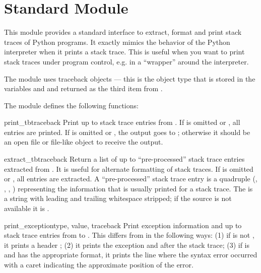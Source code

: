 \section{Standard Module }




This module provides a standard interface to extract, format and print
stack traces of Python programs.  It exactly mimics the behavior of
the Python interpreter when it prints a stack trace.  This is useful
when you want to print stack traces under program control, e.g. in a
``wrapper'' around the interpreter.

The module uses traceback objects --- this is the object type
that is stored in the variables  and
 and returned as the third item from
.

The module defines the following functions:

\begin{funcdesc}{print_tb}{traceback}
Print up to  stack trace entries from .  If
 is omitted or , all entries are printed.
If  is omitted or , the output goes to
; otherwise it should be an open file or file-like
object to receive the output.
\end{funcdesc}

\begin{funcdesc}{extract_tb}{traceback}
Return a list of up to  ``pre-processed'' stack trace
entries extracted from .  It is useful for alternate
formatting of stack traces.  If  is omitted or ,
all entries are extracted.  A ``pre-processed'' stack trace entry is a
quadruple (, , ,
) representing the information that is usually printed
for a stack trace.  The  is a string with leading and
trailing whitespace stripped; if the source is not available it is
.
\end{funcdesc}

\begin{funcdesc}{print_exception}{type, value,
traceback}
Print exception information and up to  stack trace entries
from  to .
This differs from  in the
following ways: (1) if  is not , it prints a
header ; (2) it prints the
exception  and  after the stack trace; (3) if
 is  and  has the appropriate
format, it prints the line where the syntax error occurred with a
caret indicating the approximate position of the error.
\end{funcdesc}

